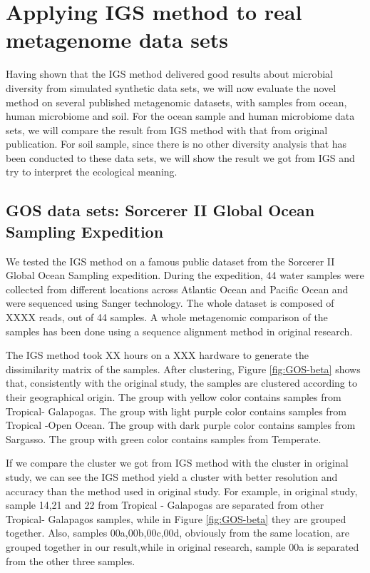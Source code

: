 \section{Applying IGS method to real metagenome data sets}

Having shown that the IGS method delivered good results about microbial diversity 
from simulated synthetic data sets, 
we will now evaluate the novel method on several published metagenomic 
datasets, with samples 
from ocean, human microbiome and soil. For the ocean sample and human microbiome 
data sets, we will compare the result from IGS method
with that from original publication. For soil sample, since there is no other 
diversity analysis that has been conducted
to these data sets, we will show the result we got from IGS and try to 
interpret the ecological meaning.


\subsection{GOS data sets: Sorcerer II Global Ocean Sampling Expedition}

We tested the IGS method on a famous public dataset from the Sorcerer II 
Global Ocean Sampling expedition.
During the expedition, 44 water samples were collected from different locations across
Atlantic Ocean and Pacific Ocean and were sequenced using Sanger technology. 
The whole dataset is composed of XXXX reads, out of 44 samples.
A whole metagenomic comparison of the samples has been done
using a sequence alignment method in original research. 

The IGS method took XX hours on a XXX hardware to generate the dissimilarity 
matrix of the samples. After clustering, 
Figure \ref{fig:GOS-beta} shows that, consistently with the original study, 
the samples are clustered according to their 
geographical origin. The group with yellow color contains samples from 
Tropical- Galapogas. The group with light purple color
contains samples from Tropical -Open Ocean. The group with dark purple 
color contains samples from Sargasso. The group 
with green color contains samples from Temperate. 

If we compare the cluster we got from IGS method with the cluster in original 
study, we can see the IGS method yield a
cluster with better resolution and accuracy than the method used in original 
study. For example, in original study,
sample 14,21 and 22 from Tropical - Galapogas are separated from other 
Tropical- Galapagos samples, while in Figure \ref{fig:GOS-beta} 
they are grouped together. Also, samples 00a,00b,00c,00d, obviously from the 
same location, are grouped together in our result,while
in original research, sample 00a is separated from the other three samples.

